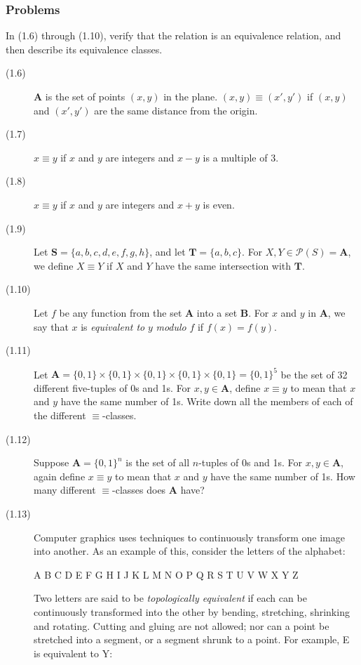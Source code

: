 \documentclass{article}
\newcommand{\Ps}{\mathcal P}
\newcommand{\Sb}{\mathbf S}
\newcommand{\A}{\mathbf A}
\newcommand{\B}{\mathbf B}
\newcommand{\T}{\mathbf T}
\begin{document}
\subsubsection*{Problems}

In (1.6) through (1.10), verify that the relation is an equivalence relation, and then describe its equivalence classes.

\begin{description}
  \item[(1.6)] $\A$ is the set of points $(x,y)$ in the plane. $(x,y) \equiv (x',y')$ if $(x,y)$ and $(x',y')$ are the same distance from the origin.
  \item[(1.7)] $x \equiv y$ if $x$ and $y$ are integers and $x - y$ is a multiple of $3$.
  \item[(1.8)] $x \equiv y$ if $x$ and $y$ are integers and $x + y$ is even.
  \item[(1.9)] Let $\Sb = \{ a,b,c,d,e,f,g,h \}$, and let $\T = \{ a,b,c \}$. For $X,Y \in \Ps(S) = \A$, we define $X \equiv Y$ if $X$ and $Y$ have the same intersection with $\T$.
  \item[(1.10)] Let $f$ be any function from the set $\A$ into a set $\B$. For $x$ and $y$ in $\A$, we say that $x$ is \emph{equivalent to} $y$ \emph{modulo} $f$ if $f(x) = f(y)$.
  \item[(1.11)] Let $\A = \{0,1\} \times \{0,1\} \times \{0,1\} \times \{0,1\} \times \{0,1\} = \{0,1\}^5$ be the set of 32 different five-tuples of 0s and 1s. For $x,y \in \A$, define $x \equiv y$ to mean that $x$ and $y$ have the same number of 1s. Write down all the members of each of the different $\equiv$-classes.
  \item[(1.12)] Suppose $\A = \{ 0,1 \}^n$ is the set of all $n$-tuples of 0s and 1s. For $x,y \in \A$, again define $x \equiv y$ to mean that $x$ and $y$ have the same number of 1s. How many different $\equiv$-classes does $\A$ have?
  \item[(1.13)] Computer graphics uses techniques to continuously transform one image into another. As an example of this, consider the letters of the alphabet:
    \begin{center}
    {\large \textsf{A B C D E F G H I J K L M N O P Q R S T U V W X Y Z} }
    \end{center}
    Two letters are said to be \emph{topologically equivalent} if each can be continuously transformed into the other by bending, stretching, shrinking and rotating. Cutting and gluing are not allowed; nor can a point be stretched into a segment, or a segment shrunk to a point. For example, {\large \textsf E} is equivalent to {\large \textsf Y}:


\end{description}
\end{document}
